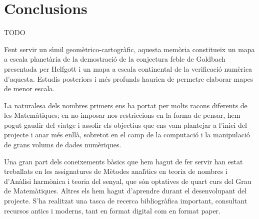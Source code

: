 \documentclass[11pt,a4paper,openright,oneside]{book}
\numberwithin{equation}{section}
\begin{document}












\chapter{Conclusions}

TODO

Fent servir un s\'{\i}mil geom\`etrico-cartogr\`afic, aquesta mem\`oria constitueix un mapa a escala planet\`aria de la demostraci\'o de la conjectura feble de Goldbach presentada per Helfgott i un mapa a escala continental de la verificaci\'o num\`erica d'aquesta. Estudis posteriors i m\'es profunds haurien de permetre elaborar mapes de menor escala.

La naturalesa dels nombres primers ens ha portat per molts racons diferents de les Matem\`atiques; en no imposar-nos restriccions en la forma de pensar, hem pogut gaudir del viatge i assolir els objectius que ens vam plantejar a l'inici del projecte i anar m\'es enll\`a, sobretot en el camp de la computaci\'o i la manipulaci\'o de grans volums de dades num\`eriques.

Una gran part dels coneixements b\`asics que hem hagut de fer servir han estat treballats en les assignatures de M\`etodes anal\'{\i}tics en teoria de nombres i d'An\`alisi harm\`onica i teoria del senyal, que s\'on optatives de quart curs del Grau de Ma\-te\-m\`a\-ti\-ques. Altres els hem hagut d'aprendre durant el desenvolupant del projecte. S'ha realitzat una tasca de recerca bibliogr\`afica important, consultant recursos antics i moderns, tant en format digital com en format paper.
\end{document}
